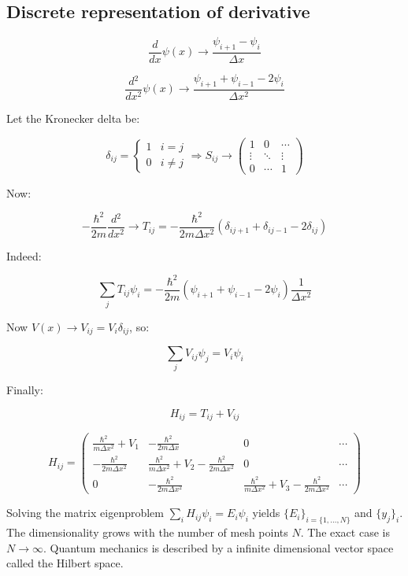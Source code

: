   \subsection{Discrete representation of derivative}

  $$\frac{d{}}{d{x}}\psi(x) \rightarrow \frac{\psi_{i+1}-\psi_i}{\Delta x}$$

  $$\frac{d{^2}}{d{x^2}}\psi(x) \rightarrow \frac{\psi_{i+1}+\psi_{i-1}-2\psi_i}{\Delta x^2}$$

  Let the Kronecker delta be:

      $$\delta_{ij} =\begin{cases}1 &i=j\\0 &i\neq j\end{cases}\Rightarrow S_{ij} \rightarrow\begin{pmatrix}1 & 0 & \cdots\\\vdots & \ddots &\vdots \\0&\cdots & 1 \end{pmatrix}$$

  Now:

  $$-\frac{\hbar^2}{2m}\frac{d{^2}}{d{x^2}}\rightarrow T_{ij}=-\frac{\hbar^2}{2m\Delta x^2}(\delta_{ij+1}+\delta_{ij-1}-2\delta_{ij})$$

  Indeed:

  $$\sum\limits_{j}T_{ij}\psi_i = -\frac{\hbar^2}{2m}(\psi_{i+1}+\psi_{i-1}-2\psi_i)\frac{1}{\Delta x^2}$$

  Now $V(x) \rightarrow V_{ij} = V_i\delta_{ij}$, so:

  $$\sum\limits_{j}V_{ij}\psi_j = V_i\psi_i$$

  Finally:

  $$H_{ij} = T_{ij} + V_{ij}$$

  $$H_{ij} = \begin{pmatrix}\frac{\hbar^2}{m\Delta x^2} + V_1 & -\frac{\hbar^2}{2m\Delta x} & 0 & \cdots\\ -\frac{\hbar^2}{2m\Delta x^2} & \frac{\hbar^2}{m\Delta x^2}+V_2-\frac{\hbar^2}{2m \Delta x^2} & 0 & \cdots\\ 0 & -\frac{\hbar^2}{2m\Delta x^2} & \frac{\hbar^2}{m\Delta x^2}+V_3 - \frac{\hbar^2}{2m\Delta x^2} & \cdots\end{pmatrix}$$

  Solving the  matrix eigenproblem $\sum\limits_i H_{ij}\psi_i = E_i\psi_i$ yields $\{E_i\}_{i=\{1,\dots,N\}}$ and $\{y_j\}_i$.
  The dimensionality grows with the number of mesh points $N$.
  The exact case is $N\rightarrow\infty$.
  Quantum mechanics is described by a infinite dimensional vector space called the Hilbert space.

